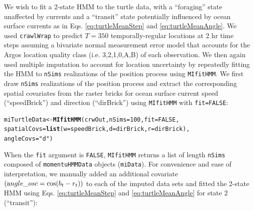 \documentclass[12pt]{article}\usepackage[]{graphicx}\usepackage[]{xcolor}
\makeatletter
\newcommand{\hlnum}[1]{\textcolor[rgb]{0.686,0.059,0.569}{#1}}%
\newcommand{\hlsng}[1]{\textcolor[rgb]{0.192,0.494,0.8}{#1}}%
\newcommand{\hldef}[1]{\textcolor[rgb]{0.345,0.345,0.345}{#1}}%
\newcommand{\hlkwb}[1]{\textcolor[rgb]{0.69,0.353,0.396}{#1}}%
\newcommand{\hlkwc}[1]{\textcolor[rgb]{0.333,0.667,0.333}{#1}}%
\newcommand{\hlkwd}[1]{\textcolor[rgb]{0.737,0.353,0.396}{\textbf{#1}}}%
\newenvironment{kframe}{%
 \def\at@end@of@kframe{}%
 \ifinner\ifhmode%
  \def\at@end@of@kframe{\end{minipage}}%
  \begin{minipage}{\columnwidth}%
 \fi\fi%
 \def\FrameCommand##1{\hskip\@totalleftmargin \hskip-\fboxsep
 \colorbox{shadecolor}{##1}\hskip-\fboxsep
     \hskip-\linewidth \hskip-\@totalleftmargin \hskip\columnwidth}%
 \MakeFramed {\advance\hsize-\width
   \@totalleftmargin\z@ \linewidth\hsize
   \@setminipage}}%
 {\par\unskip\endMakeFramed%
 \at@end@of@kframe}
\newenvironment{knitrout}{}{} %
\makeatother
\begin{document}
We wish to fit a 2-state HMM to the turtle data, with a ``foraging'' state unaffected by currents and a ``transit'' state potentially influenced by ocean surface currents as in Eqs. \ref{eq:turtleMeanStep} and \ref{eq:turtleMeanAngle}.  We used \verb|crawlWrap| to predict $T=350$ temporally-regular locations at 2 hr time steps assuming a bivariate normal measurement error model that accounts for the Argos location quality class  (i.e. 3,2,1,0,A,B) of each observation. We then again used multiple imputation to account for location uncertainty by repeatedly fitting the HMM to \verb|nSims| realizations of the position process using \verb|MIfitHMM|. We first draw \verb|nSims| realizations of the position process and extract the corresponding spatial covariates from the raster bricks for ocean surface current speed (``speedBrick'') and direction (``dirBrick'') using \verb|MIfitHMM| with \verb|fit=FALSE|:
\begin{knitrout}
\color{fgcolor}\begin{kframe}
\begin{alltt}
\hldef{miTurtleData} \hlkwb{<-} \hlkwd{MIfitHMM}\hldef{(crwOut,} \hlkwc{nSims} \hldef{=} \hlnum{100}\hldef{,} \hlkwc{fit}\hldef{=}\hlnum{FALSE}\hldef{,}
                 \hlkwc{spatialCovs} \hldef{=} \hlkwd{list}\hldef{(}\hlkwc{w} \hldef{= speedBrick,} \hlkwc{d} \hldef{= dirBrick,} \hlkwc{r} \hldef{= dirBrick),}
                 \hlkwc{angleCovs} \hldef{=} \hlsng{"d"}\hldef{)}
\end{alltt}
\end{kframe}
\end{knitrout}
When the \verb|fit| argument is \verb|FALSE|, \verb|MIfitHMM| returns a list of length \verb|nSims| composed of \verb|momentuHMMData| objects (\verb|miData|). For convenience and ease of interpretation, we manually added an additional covariate $\left({\text angle\_osc}=\cos(b_t-r_t)\right)$ to each of the imputed data sets and fitted the 2-state HMM using Eqs. \ref{eq:turtleMeanStep} and \ref{eq:turtleMeanAngle} for state 2 (``transit''):
\end{document}
